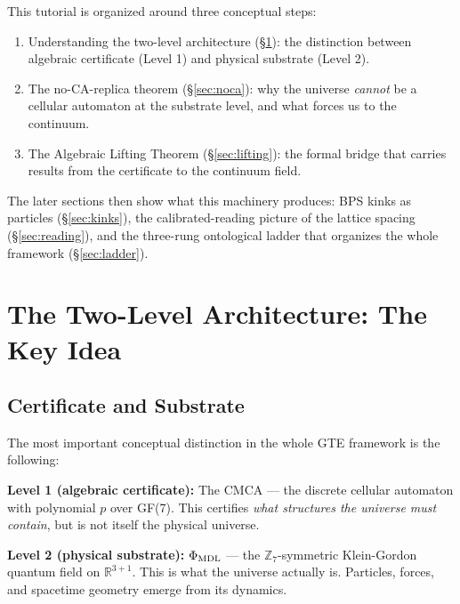 \documentclass[11pt,a4paper]{article}
\newcommand{\PhiMDL}{\Phi_{\rm MDL}}
\newcommand{\ZS}{\mathbb{Z}_7}
\newcommand{\poly}{p}
\theoremstyle{definition}
\begin{document}
This tutorial is organized around three conceptual steps:
\begin{enumerate}
  \item Understanding the two-level architecture (§\ref{sec:twolevel}):
    the distinction between algebraic certificate (Level 1) and physical
    substrate (Level 2).
  \item The no-CA-replica theorem (§\ref{sec:noca}): why the universe
    \emph{cannot} be a cellular automaton at the substrate level, and what
    forces us to the continuum.
  \item The Algebraic Lifting Theorem (§\ref{sec:lifting}): the formal bridge
    that carries results from the certificate to the continuum field.
\end{enumerate}
The later sections then show what this machinery produces:
BPS kinks as particles (§\ref{sec:kinks}), the calibrated-reading picture of
the lattice spacing (§\ref{sec:reading}), and the three-rung ontological
ladder that organizes the whole framework (§\ref{sec:ladder}).

\section{The Two-Level Architecture: The Key Idea}
\label{sec:twolevel}

\subsection{Certificate and Substrate}

The most important conceptual distinction in the whole GTE framework is the following:

\begin{tcolorbox}[colback=boxorange,colframe=orange!60!black,title=The fundamental distinction]
\textbf{Level 1 (algebraic certificate):} The CMCA --- the discrete cellular
automaton with polynomial $\poly$ over GF(7).
This certifies \emph{what structures the universe must contain}, but is not
itself the physical universe.

\medskip
\noindent
\textbf{Level 2 (physical substrate):} $\PhiMDL$ --- the $\ZS$-symmetric
Klein-Gordon quantum field on $\mathbb{R}^{3+1}$.
This is what the universe actually is.  Particles, forces, and spacetime
geometry emerge from its dynamics.
\end{tcolorbox}
\end{document}
